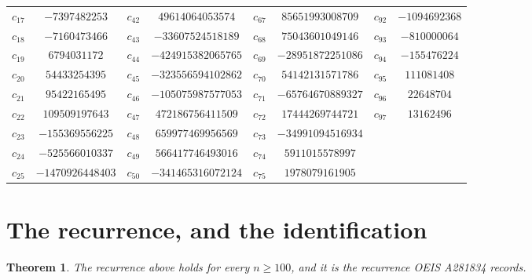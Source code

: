 \documentclass[11pt,a4paper]{article}
\theoremstyle{plain}
\newtheorem{theorem}{Theorem}
\theoremstyle{definition}
\begin{document}
\begin{center}
\begin{tabular}{cccccccc}
$c_{17}$ & $-7397482253$ & $c_{42}$ & $49614064053574$ & $c_{67}$ & $85651993008709$ & $c_{92}$ & $-1094692368$ \\
$c_{18}$ & $-7160473466$ & $c_{43}$ & $-33607524518189$ & $c_{68}$ & $75043601049146$ & $c_{93}$ & $-810000064$ \\
$c_{19}$ & $6794031172$ & $c_{44}$ & $-424915382065765$ & $c_{69}$ & $-28951872251086$ & $c_{94}$ & $-155476224$ \\
$c_{20}$ & $54433254395$ & $c_{45}$ & $-323556594102862$ & $c_{70}$ & $54142131571786$ & $c_{95}$ & $111081408$ \\
$c_{21}$ & $95422165495$ & $c_{46}$ & $-105075987577053$ & $c_{71}$ & $-65764670889327$ & $c_{96}$ & $22648704$ \\
$c_{22}$ & $109509197643$ & $c_{47}$ & $472186756411509$ & $c_{72}$ & $17444269744721$ & $c_{97}$ & $13162496$ \\
$c_{23}$ & $-155369556225$ & $c_{48}$ & $659977469956569$ & $c_{73}$ & $-34991094516934$ &  &  \\
$c_{24}$ & $-525566010337$ & $c_{49}$ & $566417746493016$ & $c_{74}$ & $5911015578997$ &  &  \\
$c_{25}$ & $-1470926448403$ & $c_{50}$ & $-341465316072124$ & $c_{75}$ & $1978079161905$ &  &  \\
\end{tabular}
\end{center}

\section{The recurrence, and the identification}

\begin{theorem}
The recurrence above holds for every $n\ge100$, and it is the recurrence OEIS A281834 records.
\end{theorem}
\end{document}
